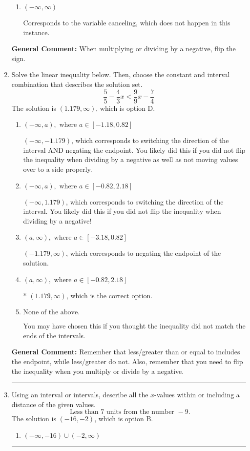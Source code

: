 \documentclass{extbook}[14pt]
\newcommand{\litem}[1]{\item #1

\rule{\textwidth}{0.4pt}}
\begin{document}
\begin{enumerate}
{\begin{enumerate}[label=\Alph*.]
 * Correct option.
\item \( (-\infty, \infty) \)

Corresponds to the variable canceling, which does not happen in this instance.
\end{enumerate}

\textbf{General Comment:} When multiplying or dividing by a negative, flip the sign.
}
\litem{
Solve the linear inequality below. Then, choose the constant and interval combination that describes the solution set.
\[ \frac{5}{5} - \frac{4}{3} x < \frac{9}{9} x - \frac{7}{4} \]The solution is \( (1.179, \infty) \), which is option D.\begin{enumerate}[label=\Alph*.]
\item \( (-\infty, a), \text{ where } a \in [-1.18, 0.82] \)

 $(-\infty, -1.179)$, which corresponds to switching the direction of the interval AND negating the endpoint. You likely did this if you did not flip the inequality when dividing by a negative as well as not moving values over to a side properly.
\item \( (-\infty, a), \text{ where } a \in [-0.82, 2.18] \)

 $(-\infty, 1.179)$, which corresponds to switching the direction of the interval. You likely did this if you did not flip the inequality when dividing by a negative!
\item \( (a, \infty), \text{ where } a \in [-3.18, 0.82] \)

 $(-1.179, \infty)$, which corresponds to negating the endpoint of the solution.
\item \( (a, \infty), \text{ where } a \in [-0.82, 2.18] \)

* $(1.179, \infty)$, which is the correct option.
\item \( \text{None of the above}. \)

You may have chosen this if you thought the inequality did not match the ends of the intervals.
\end{enumerate}

\textbf{General Comment:} Remember that less/greater than or equal to includes the endpoint, while less/greater do not. Also, remember that you need to flip the inequality when you multiply or divide by a negative.
}
\litem{
Using an interval or intervals, describe all the $x$-values within or including a distance of the given values.
\[ \text{ Less than } 7 \text{ units from the number } -9. \]The solution is \( (-16, -2) \), which is option B.\begin{enumerate}[label=\Alph*.]
\item \( (-\infty, -16) \cup (-2, \infty) \)


\end{enumerate}}
\end{enumerate}
\end{document}
